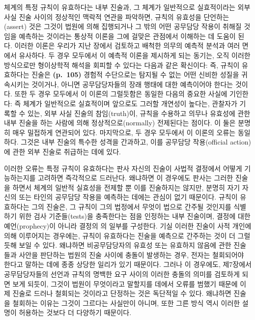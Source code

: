 체계의 특정 규칙이 유효하다는 내부 진술과, 그 체계가 일반적으로
실효적이라는 외부 사실 진술 사이의 정상적인 맥락적 연관을 파악하면,
규칙의 유효성을 단언하는(assert) 것은 그것이 법원에 의해 집행되거나 그
밖의 어떤 공무담당 작용이 취해질 것임을 예측하는 것이라는 통상적 이론을
그에 걸맞은 관점에서 이해하는 데 도움이 된다. 이러한 이론은 우리가 지난
장에서 검토하고 배척한 의무의 예측적 분석과 여러 면에서 유사하다. 두
경우 모두에서 이 예측적 이론을 제시하게 되는 동기는, 오직 이러한
방식으로만 형이상학적 해석을 회피할 수 있다는 다음과 같은 확신이다: 즉,
규칙이 유효하다는 진술은 \textbf{(p.~105)} 경험적 수단으로는 탐지될 수
없는 어떤 신비한 성질을 귀속시키는 것이거나, 아니면 공무담당자들의 장래
행태에 대한 예측이어야 한다는 것이다. 또한 두 경우 모두에서 이 이론의
그럴듯함은 동일한 다음의 중요한 사실에 기인한다: 즉 체계가 일반적으로
실효적이며 앞으로도 그러할 개연성이 높다는, 관찰자가 기록할 수 있는,
외부 사실 진술의 참임(truth)이, 규칙을 수용하고 의무나 유효성에 관한
내부 진술을 하는 사람에 의해 정상적으로(normally) 전제된다는 점이다. 이
둘은 분명히 매우 밀접하게 연관되어 있다. 마지막으로, 두 경우 모두에서 이
이론의 오류는 동일하다. 그것은 내부 진술의 특수한 성격을 간과하고, 이를
공무담당 작용(official action)에 관한 외부 진술로 취급하는 데에 있다.

이러한 오류는 특정 규칙이 유효하다는 판사 자신의 진술이 사법적 결정에서
어떻게 기능하는지를 고려하면 즉각적으로 드러난다. 왜냐하면 이 경우에도
판사는 그러한 진술을 하면서 체계의 일반적 실효성을 전제할 뿐 이를
진술하지는 않지만, 분명히 자기 자신의 또는 타인의 공무담당 작용을
예측하는 데에는 관심이 없기 때문이다. 규칙이 유효하다는 그의 진술은, 그
규칙이 그의 법정에서 무엇이 법으로 간주될 것인지를 식별하기 위한 검사
기준들(tests)을 충족한다는 점을 인정하는 내부 진술이며, 결정에 대한
예언(prophecy)이 아니라 결정의 의 일부를 구성한다.
기실 이러한 진술이 사적 개인에 의해 이루어지는 경우에는, 규칙이
유효하다는 진술을 예측으로 간주하는 것이 더 그럴듯해 보일 수 있다.
왜냐하면 비공무담당자의 유효성 또는 유효하지 않음에 관한 진술들과 사안을
판단하는 법원의 진술 사이에 충돌이 발생하는 경우, 전자는 철회되어야
한다고 말하는 데에 종종 상당한 일리가 있기 때문이다. 그러나 이 경우에도,
제7장에서 공무담당자들의 선언과 규칙의 명백한 요구 사이의 이러한 충돌의
의미를 검토하게 되면 보게 되듯이, 그것이 법원이 무엇이라고 말할지를
 데에서 오류를 범했기 때문에 이제
 진술로 드러나 철회되는 것이라고 단정하는 것은
독단적일 수 있다. 왜냐하면 진술을 철회하는 이유는 그것이 그르다는
사실만이 아니며, 또한 그른 방식 역시 이러한 설명이 허용하는 것보다 더
다양하기 때문이다.


